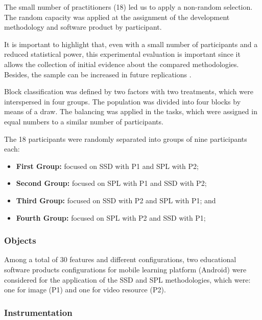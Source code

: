 The small number of practitioners (18) led us to apply a non-random selection. The random capacity was applied at the assignment of the development methodology and software product by participant. 

It is important to highlight that, even with a small number of participants and a reduced statistical power, this experimental evaluation is important since it allows the collection of initial evidence about the compared methodologies. Besides, the sample can be increased in future replications \cite{falessi2017,host2000}.

Block classification was defined by two factors with two treatments, which were interspersed in four groups. The population was divided into four blocks by means of a draw. The balancing was applied in the tasks, which were assigned in equal numbers to a similar number of participants.


The 18 participants were randomly separated into groups of nine participants each:

\begin{itemize}
\item \textbf{First Group:} focused on SSD with P1 and SPL with P2;

\item \textbf{Second Group:} focused on SPL with P1 and SSD with P2;

\item \textbf{Third Group:} focused on SSD with P2 and SPL with P1; and

\item \textbf{Fourth Group:} focused on SPL with P2 and SSD with P1;
\end{itemize}

\subsubsection{Objects}

Among a total of 30 features and different configurations, two educational software products configurations for mobile learning platform (Android) were considered for the application of the SSD and SPL methodologies, which were: one for image (P1) and one for video resource (P2).

\subsubsection{Instrumentation}

